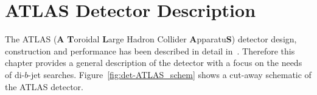 

\section{ATLAS Detector Description}
\label{sec:det-ATLAS}

The ATLAS (\textbf{A} \textbf{T}oroidal \textbf{L}arge Hadron Collider \textbf{A}pparatu\textbf{S}) detector
design, construction and performance has been described in detail in~\cite{det-ATLAS_Exp, det-ATLAS_TDR, det-ATLAS_Perf}.
Therefore this chapter provides a general description of the detector with a focus on the needs of di-$b$-jet searches.
Figure~\ref{fig:det-ATLAS_schem} shows a cut-away schematic of the ATLAS detector.

